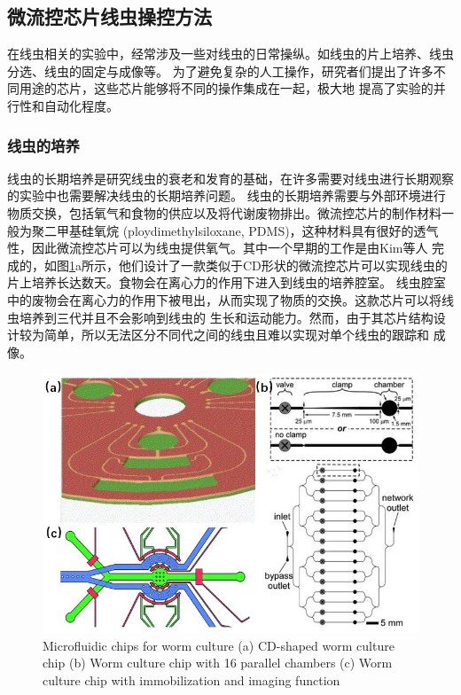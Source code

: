 \subsection{微流控芯片线虫操控方法}
	在线虫相关的实验中，经常涉及一些对线虫的日常操纵。如线虫的片上培养、线虫分选、线虫的固定与成像等。
	为了避免复杂的人工操作，研究者们提出了许多不同用途的芯片，这些芯片能够将不同的操作集成在一起，极大地
	提高了实验的并行性和自动化程度。
	
\subsubsection{线虫的培养}
\label{sec:intro:analog}
	线虫的长期培养是研究线虫的衰老和发育的基础，在许多需要对线虫进行长期观察的实验中也需要解决线虫的长期培养问题。
	线虫的长期培养需要与外部环境进行物质交换，包括氧气和食物的供应以及将代谢废物排出。微流控芯片的制作材料一般为聚二甲基硅氧烷
	(ploydimethylsiloxane, PDMS)，这种材料具有很好的透气性，因此微流控芯片可以为线虫提供氧气。其中一个早期的工作是由Kim等人\cite{Kim2007Automated}
	完成的，如图\ref{fig:cd}a所示，他们设计了一款类似于CD形状的微流控芯片可以实现线虫的片上培养长达数天。食物会在离心力的作用下进入到线虫的培养腔室。
	线虫腔室中的废物会在离心力的作用下被甩出，从而实现了物质的交换。这款芯片可以将线虫培养到三代并且不会影响到线虫的
	生长和运动能力。然而，由于其芯片结构设计较为简单，所以无法区分不同代之间的线虫且难以实现对单个线虫的跟踪和
	成像。
	\begin{figure}[h]
	  \centering
	  \includegraphics[width=12cm]{figure/chap1/wormculture.jpg}
		{Microfluidic chips for worm culture
		(a) CD-shaped worm culture chip\cite{Kim2007Automated}
		(b) Worm culture chip with 16 parallel chambers\cite{Hulme2010Lifespan}
		(c) Worm culture chip with immobilization and imaging function\cite{Krajniak2010Long}}
	  \label{fig:cd}
	\end{figure}
	
